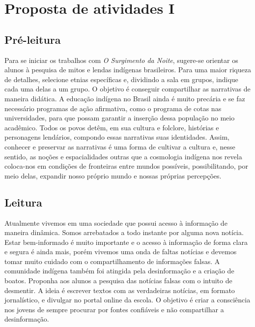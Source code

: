 \documentclass[12pt]{extarticle}
\begin{document}
\tableofcontents
\section{Proposta de atividades I}

\subsection{Pré-leitura}



Para se iniciar os trabalhos com \emph{O Surgimento
da Noite}, sugere-se orientar os alunos à pesquisa de mitos e lendas
indígenas brasileiros. Para uma maior riqueza de detalhes, selecione
etnias específicas e, dividindo a sala em grupos, indique cada uma delas
a um grupo. O objetivo é conseguir compartilhar as narrativas de maneira
didática. A educação indígena no Brasil ainda é muito precária e se faz
necessário programas de ação afirmativa, como o programa de cotas nas
universidades, para que possam garantir a inserção dessa população no
meio acadêmico. Todos os povos detêm, em sua cultura e folclore,
histórias e personagens lendários, compondo essas narrativas suas
identidades. Assim, conhecer e preservar as narrativas é uma forma de
cultivar a cultura e, nesse sentido, as noções e espacialidades outras 
que a cosmologia indígena nos revela coloca-nos em condições de fronteiras 
entre mundos possíveis, possibilitando, por meio delas, expandir nosso 
próprio mundo e nossas próprias percepções.


\subsection{Leitura}


Atualmente vivemos em uma sociedade que possui acesso à
informação de maneira dinâmica. Somos arrebatados a todo instante por
alguma nova notícia. Estar bem-informado é muito importante e o acesso à
informação de forma clara e segura é ainda mais, porém vivemos uma onda
de faltas notícias e devemos tomar muito cuidado com o compartilhamento
de informações falsas. A comunidade indígena também foi atingida pela
desinformação e a criação de boatos. Proponha aos alunos a pesquisa das
notícias falsas com o intuito de desmentir. A ideia é escrever textos
com as verdadeiras notícias, em formato jornalístico, e divulgar no
portal online da escola. O objetivo é criar a consciência nos jovens de
sempre procurar por fontes confiáveis e não compartilhar a
desinformação.
\end{document}
